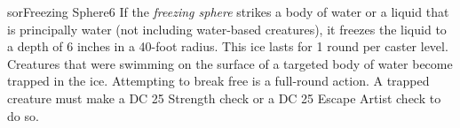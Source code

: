 \begin{spellcard}{sor}{Freezing Sphere}{6}
  \medskip
  If the \emph{freezing sphere} strikes a body of water or a liquid that
  is principally water (not including water-based creatures), it freezes
  the liquid to a depth of 6 inches in a 40-foot radius. This ice lasts
  for 1 round per caster level. Creatures that were swimming on the
  surface of a targeted body of water become trapped in the ice.
  Attempting to break free is a full-round action. A trapped creature must
  make a DC 25 Strength check or a DC 25 Escape Artist check to do so.
\end{spellcard}
